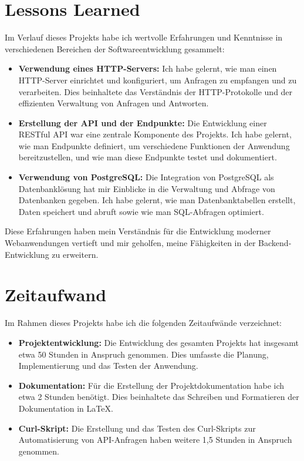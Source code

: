\documentclass{article}
\begin{document}
\section{Lessons Learned}

Im Verlauf dieses Projekts habe ich wertvolle Erfahrungen und Kenntnisse in verschiedenen Bereichen der Softwareentwicklung gesammelt:

\begin{itemize}
    \item \textbf{Verwendung eines HTTP-Servers:} Ich habe gelernt, wie man einen HTTP-Server einrichtet und konfiguriert, um Anfragen zu empfangen und zu verarbeiten. Dies beinhaltete das Verständnis der HTTP-Protokolle und der effizienten Verwaltung von Anfragen und Antworten.

    \item \textbf{Erstellung der API und der Endpunkte:} Die Entwicklung einer RESTful API war eine zentrale Komponente des Projekts. Ich habe gelernt, wie man Endpunkte definiert, um verschiedene Funktionen der Anwendung bereitzustellen, und wie man diese Endpunkte testet und dokumentiert.

    \item \textbf{Verwendung von PostgreSQL:} Die Integration von PostgreSQL als Datenbanklösung hat mir Einblicke in die Verwaltung und Abfrage von Datenbanken gegeben. Ich habe gelernt, wie man Datenbanktabellen erstellt, Daten speichert und abruft sowie wie man SQL-Abfragen optimiert.

\end{itemize}

Diese Erfahrungen haben mein Verständnis für die Entwicklung moderner Webanwendungen vertieft und mir geholfen, meine Fähigkeiten in der Backend-Entwicklung zu erweitern.

\section{Zeitaufwand}

Im Rahmen dieses Projekts habe ich die folgenden Zeitaufwände verzeichnet:

\begin{itemize}
    \item \textbf{Projektentwicklung:} Die Entwicklung des gesamten Projekts hat insgesamt etwa 50 Stunden in Anspruch genommen. Dies umfasste die Planung, Implementierung und das Testen der Anwendung.

    \item \textbf{Dokumentation:} Für die Erstellung der Projektdokumentation habe ich etwa 2 Stunden benötigt. Dies beinhaltete das Schreiben und Formatieren der Dokumentation in LaTeX.

    \item \textbf{Curl-Skript:} Die Erstellung und das Testen des Curl-Skripts zur Automatisierung von API-Anfragen haben weitere 1,5 Stunden in Anspruch genommen.

\end{itemize}
\end{document}
